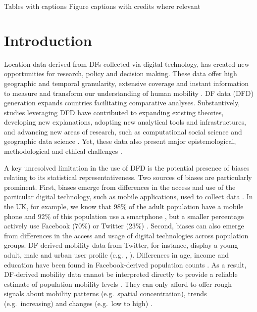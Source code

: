 \documentclass[]{rsos}%
\begin{document}
Tables with captions Figure captions with credits where relevant

\newpage

\section{Introduction}\label{introduction}

Location data derived from DFs collected via digital technology, has created new opportunities for research, policy and decision making. These data offer high geographic and temporal granularity, extensive coverage and instant information to measure and transform our understanding of human mobility \citep{oliver20-health}. DF data (DFD) generation expands countries facilitating comparative analyses. Substantively, studies leveraging DFD have contributed to expanding existing theories, developing new explanations, adopting new analytical tools and infrastructures, and advancing new areas of research, such as computational social science and geographic data science \citep{pappalardo23-directions}. Yet, these data also present major epistemological, methodological and ethical challenges \citep{rowe23-bigdata}.

A key unresolved limitation in the use of DFD is the potential presence of biases relating to its statistical representativeness. Two sources of biases are particularly prominent. First, biases emerge from differences in the access and use of the particular digital technology, such as mobile applications, used to collect data \citep{wesolowski13-biases}. In the UK, for example, we know that 98\% of the adult population have a mobile phone and 92\% of this population use a smartphone \citep{ofcom23}, but a smaller percentage actively use Facebook (70\%) or Twitter (23\%) \citep{statista24}. Second, biases can also emerge from differences in the access and usage of digital technologies across population groups. DF-derived mobility data from Twitter, for instance, display a young adult, male and urban user profile (e.g. \citep{mislove21-twitter}, \citep{sloan13-twitter}). Differences in age, income and education have been found in Facebook-derived population counts \citep{ribeiro20-facebook}. As a result, DF-derived mobility data cannot be interpreted directly to provide a reliable estimate of population mobility levels \citep{cesare18-promises}. They can only afford to offer rough signals about mobility patterns (e.g.~spatial concentration), trends (e.g.~increasing) and changes (e.g.~low to high) \citep{rowe22-sensing-ukraine}.
\end{document}
